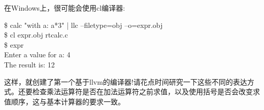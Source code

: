 在Windows上，很可能会使用cl编译器:\par

\begin{tcolorbox}[colback=white,colframe=black]
\$ calc "with a: a*3" | llc –filetype=obj –o=expr.obj \\
\$ cl expr.obj rtcalc.c \\
\$ expr \\
\hspace*{0.5cm}Enter a value for a: 4 \\
\hspace*{0.5cm}The result is: 12
\end{tcolorbox}

这样，就创建了第一个基于llvm的编译器!请花点时间研究一下这些不同的表达方式。还要检查乘法运算符是否在加法运算符之前求值，以及使用括号是否会改变求值顺序，这与基本计算器的要求一致。\par







